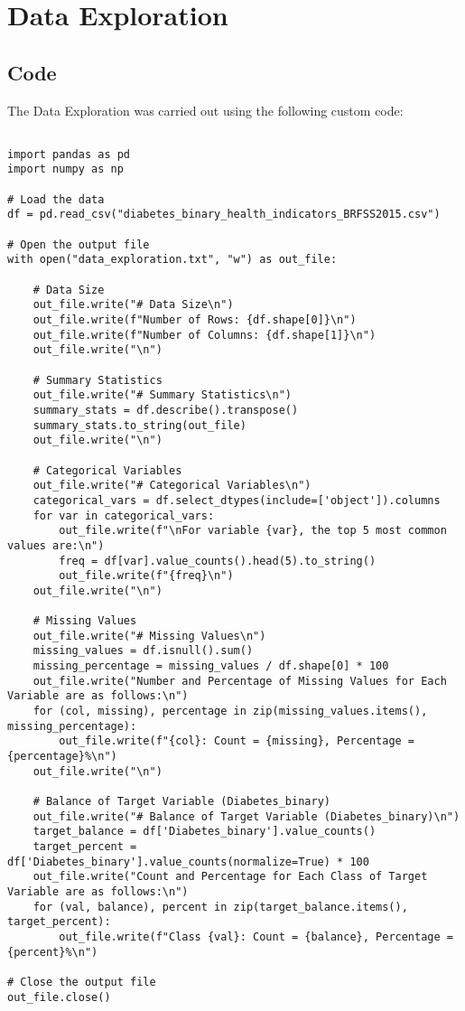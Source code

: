 \documentclass[11pt]{article}
\begin{document}
\section{Data Exploration} \subsection{Code}The Data Exploration was carried out using the following custom code:

\begin{verbatim}

import pandas as pd
import numpy as np

# Load the data
df = pd.read_csv("diabetes_binary_health_indicators_BRFSS2015.csv")

# Open the output file
with open("data_exploration.txt", "w") as out_file:
    
    # Data Size
    out_file.write("# Data Size\n")
    out_file.write(f"Number of Rows: {df.shape[0]}\n")
    out_file.write(f"Number of Columns: {df.shape[1]}\n")
    out_file.write("\n")
    
    # Summary Statistics
    out_file.write("# Summary Statistics\n")
    summary_stats = df.describe().transpose()
    summary_stats.to_string(out_file)
    out_file.write("\n")
    
    # Categorical Variables
    out_file.write("# Categorical Variables\n")
    categorical_vars = df.select_dtypes(include=['object']).columns
    for var in categorical_vars:
        out_file.write(f"\nFor variable {var}, the top 5 most common values are:\n")
        freq = df[var].value_counts().head(5).to_string()
        out_file.write(f"{freq}\n")
    out_file.write("\n")
    
    # Missing Values
    out_file.write("# Missing Values\n")
    missing_values = df.isnull().sum()
    missing_percentage = missing_values / df.shape[0] * 100
    out_file.write("Number and Percentage of Missing Values for Each Variable are as follows:\n")
    for (col, missing), percentage in zip(missing_values.items(), missing_percentage):
        out_file.write(f"{col}: Count = {missing}, Percentage = {percentage}%\n")
    out_file.write("\n")
    
    # Balance of Target Variable (Diabetes_binary)
    out_file.write("# Balance of Target Variable (Diabetes_binary)\n")
    target_balance = df['Diabetes_binary'].value_counts()
    target_percent = df['Diabetes_binary'].value_counts(normalize=True) * 100
    out_file.write("Count and Percentage for Each Class of Target Variable are as follows:\n")
    for (val, balance), percent in zip(target_balance.items(), target_percent):
        out_file.write(f"Class {val}: Count = {balance}, Percentage = {percent}%\n")

# Close the output file
out_file.close()

\end{verbatim}
\end{document}
